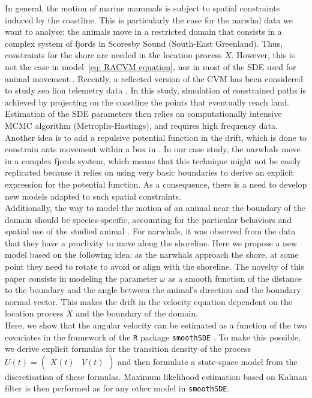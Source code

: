 \documentclass[11pt]{article}
\newcommand {\1}{\mathbb{1}}
\theoremstyle{definition}
\theoremstyle{remark}
\theoremstyle{remark}
\begin{document}
In general, the motion of marine mammals is subject to spatial constraints induced by the coastline. This is particularly the case for the narwhal data we want to analyse: the animals move in a restricted domain that consists in a complex system of fjords in Scoresby Sound (South-East Greenland). Thus, constraints for the shore are needed in the location process $X$. However, this is not the case in model~\eqref{eq: RACVM equation}, nor in most of the SDE used for animal movement \cite{johnson_continuoustime_2008,michelot_varying-coefficient_2021,gurarie_correlated_2017}. 
Recently, a reflected version of the CVM has been considered to study sea lion telemetry data \cite{hanks_reflected_2017}.
In this study, simulation of constrained paths is achieved by projecting on the coastline the  points that eventually reach land. Estimation of the SDE parameters then relies on computationally intensive MCMC algorithm (Metroplis-Hastings), and requires high frequency data. Another idea is to add a repulsive potential function in the drift, which is done to constrain ants movement within a box in \cite{russell_spatially_2018}. In our case study, the narwhals move in a complex fjords system, which means that this technique might not be easily replicated because it relies on using very basic boundaries to derive an explicit expression for the potential function. As a consequence, there is a need to develop new models adapted to such spatial constraints.\\
Additionally, the way to model the motion of an animal near the boundary of the domain should be species-specific, accounting for the particular behaviors and spatial use of the studied animal \cite{brillinger_simulating_2003}. For narwhals, it was observed from the data that they have a proclivity to move along the shoreline. Here we propose a new model based on the following idea: as the narwhals approach the shore, at some point they need to rotate to avoid or align with the shoreline. The novelty of this paper consists in modeling the parameter $\omega$ as a smooth function of the distance to the boundary and the angle between the animal's direction and the boundary normal vector. This makes the drift in the velocity equation dependent on the location process $X$ and the boundary of the domain.  \\ %



Here, we show that the angular velocity  can be estimated as a function of the two covariates in the framework of the \texttt{R} package \texttt{smoothSDE} \cite{michelot_varying-coefficient_2021}. To make this possible, we derive explicit formulas for the transition density of the process $U(t)=\begin{pmatrix} X(t) & V(t) \end{pmatrix}$ and then formulate a state-space model from the discretisation of these formulas. Maximum likelihood estimation based on Kalman filter is then performed as for any other model in \texttt{smoothSDE}.\\
\end{document}
